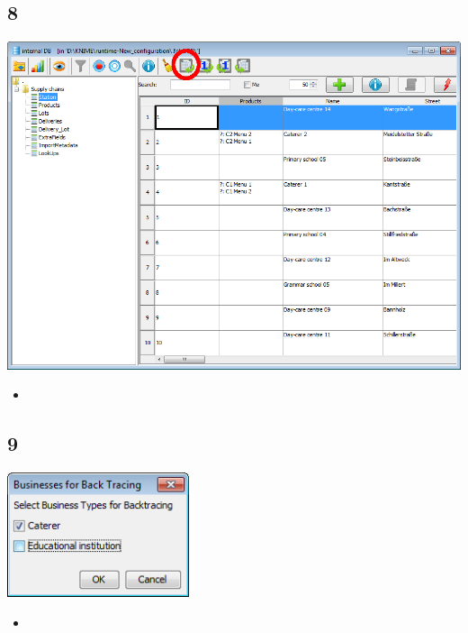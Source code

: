 \documentclass{beamer}
\begin{document}
\subsection{8}
\begin{frame}
	\begin{center}
  		\includegraphics[height=0.6\textheight]{8.png}
	\end{center}
	\begin{itemize}
		\item
	\end{itemize}
\end{frame}

\subsection{9}
\begin{frame}
	\begin{center}
  		\includegraphics[width=0.4\textwidth]{9.png}
	\end{center}
	\begin{itemize}
		\item
	\end{itemize}
\end{frame}
\end{document}
